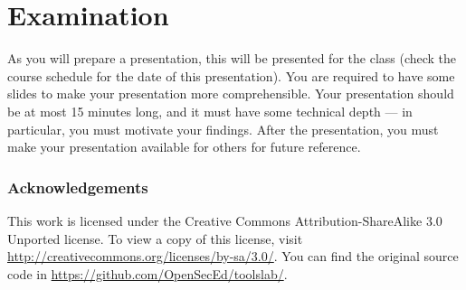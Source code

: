 \section{Examination}%
\label{sec:exam}
As you will prepare a presentation, this will be presented for the class (check 
the course schedule for the date of this presentation).
You are required to have some slides to make your presentation more 
comprehensible.
Your presentation should be at most 15 minutes long, and it must have some 
technical depth --- in particular, you must motivate your findings.
After the presentation, you must make your presentation available for others 
for future reference.


\subsubsection*{Acknowledgements}

This work is licensed under the Creative Commons Attribution-ShareAlike 3.0 
Unported license.
To view a copy of this license, visit 
\url{http://creativecommons.org/licenses/by-sa/3.0/}.
You can find the original source code in 
\url{https://github.com/OpenSecEd/toolslab/}.


\printbibliography{}
